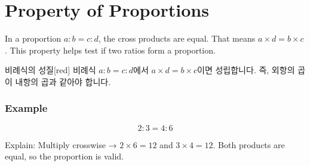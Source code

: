 \documentclass[12pt]{book}
\begin{document}
  
  
  
  
  

  \twosidedpaper
\section{Property of Proportions}

In a proportion $a:b = c:d$, the cross products are equal.  
That means $a \times d = b \times c$.  
This property helps test if two ratios form a proportion.


\begin{flexbox}{비례식의 성질}[red]
비례식 $a:b=c:d$에서 $a \times d = b \times c$이면 성립합니다.  
즉, 외항의 곱이 내항의 곱과 같아야 합니다.
\end{flexbox}

\subsubsection*{Example}

\[
2:3 = 4:6
\]

Explain: Multiply crosswise → $2 \times 6 = 12$ and $3 \times 4 = 12$.  
Both products are equal, so the proportion is valid.
\end{document}
